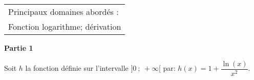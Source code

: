 
\smallskip

\begin{tabular}{|l|}\hline
Principaux domaines abordés :\\
Fonction logarithme; dérivation\\ \hline
\end{tabular}

\begin{center}\textbf{Partie 1}\end{center}

Soit $h$ la fonction définie sur l'intervalle $]0~;~ +\infty[$ par:
$h(x) = 1 + \dfrac{\ln (x)}{x^2}.$


\medskip

